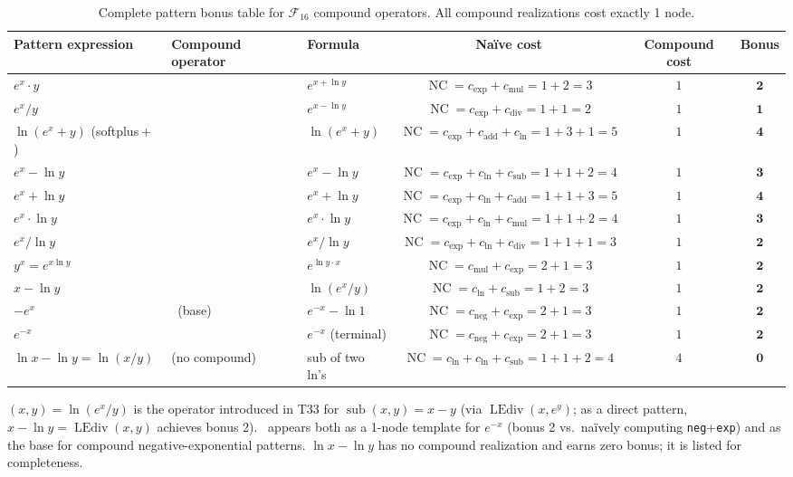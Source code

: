 \documentclass[12pt,a4paper]{article}
\theoremstyle{definition}
\newcommand{\EML}{\operatorname{EML}}
\newcommand{\EDL}{\operatorname{EDL}}
\newcommand{\EXL}{\operatorname{EXL}}
\newcommand{\EAL}{\operatorname{EAL}}
\newcommand{\DEML}{\operatorname{DEML}}
\newcommand{\ELAd}{\operatorname{ELAd}}
\newcommand{\ELSb}{\operatorname{ELSb}}
\newcommand{\LEAd}{\operatorname{LEAd}}
\newcommand{\LEdiv}{\operatorname{LEdiv}}
\newcommand{\EPL}{\operatorname{EPL}}
\newcommand{\NC}{\operatorname{NC}}
\begin{document}
\begin{table}[h]
\centering
\caption{Complete pattern bonus table for $\mathcal{F}_{16}$ compound operators.
         All compound realizations cost exactly 1 node.}
\label{tab:bonuses}
\smallskip
\begin{tabular}{@{}lllccc@{}}
\toprule
\textbf{Pattern expression}
  & \textbf{Compound operator}
  & \textbf{Formula}
  & \textbf{Na\"{i}ve cost}
  & \textbf{Compound cost}
  & \textbf{Bonus} \\
\midrule
%
$e^x \cdot y$
  & \ELAd
  & $e^{x + \ln y}$
  & $\NC = c_{\exp}+c_{\mathrm{mul}} = 1+2 = 3$
  & $1$
  & $\mathbf{2}$ \\
%
$e^x / y$
  & \ELSb
  & $e^{x - \ln y}$
  & $\NC = c_{\exp}+c_{\mathrm{div}} = 1+1 = 2$
  & $1$
  & $\mathbf{1}$ \\
%
$\ln(e^x + y)$ \textsf{(softplus$\!+\!$)}
  & \LEAd
  & $\ln(e^x + y)$
  & $\NC = c_{\exp}+c_{\mathrm{add}}+c_{\ln} = 1+3+1 = 5$
  & $1$
  & $\mathbf{4}$ \\
%
$e^x - \ln y$
  & \EML
  & $e^x - \ln y$
  & $\NC = c_{\exp}+c_{\ln}+c_{\mathrm{sub}} = 1+1+2 = 4$
  & $1$
  & $\mathbf{3}$ \\
%
$e^x + \ln y$
  & \EAL
  & $e^x + \ln y$
  & $\NC = c_{\exp}+c_{\ln}+c_{\mathrm{add}} = 1+1+3 = 5$
  & $1$
  & $\mathbf{4}$ \\
%
$e^x \cdot \ln y$
  & \EXL
  & $e^x \cdot \ln y$
  & $\NC = c_{\exp}+c_{\ln}+c_{\mathrm{mul}} = 1+1+2 = 4$
  & $1$
  & $\mathbf{3}$ \\
%
$e^x / \ln y$
  & \EDL
  & $e^x / \ln y$
  & $\NC = c_{\exp}+c_{\ln}+c_{\mathrm{div}} = 1+1+1 = 3$
  & $1$
  & $\mathbf{2}$ \\
%
$y^x = e^{x \ln y}$
  & \EPL
  & $e^{\ln y \cdot x}$
  & $\NC = c_{\mathrm{mul}}+c_{\exp} = 2+1 = 3$
  & $1$
  & $\mathbf{2}$ \\
%
$x - \ln y$
  & \LEdiv
  & $\ln(e^x / y)$
  & $\NC = c_{\ln}+c_{\mathrm{sub}} = 1+2 = 3$
  & $1$
  & $\mathbf{2}$ \\
%
$-e^x$
  & \DEML\ (base)
  & $e^{-x} - \ln 1$
  & $\NC = c_{\mathrm{neg}}+c_{\exp} = 2+1 = 3$
  & $1$
  & $\mathbf{2}$ \\
%
$e^{-x}$
  & \DEML
  & $e^{-x}$ (terminal)
  & $\NC = c_{\mathrm{neg}}+c_{\exp} = 2+1 = 3$
  & $1$
  & $\mathbf{2}$ \\
%
$\ln x - \ln y = \ln(x/y)$
  & (no compound)
  & sub of two ln's
  & $\NC = c_{\ln}+c_{\ln}+c_{\mathrm{sub}} = 1+1+2 = 4$
  & $4$
  & $\mathbf{0}$ \\
%
\bottomrule
\end{tabular}

\smallskip
\footnotesize{
\LEdiv$(x,y) = \ln(e^x/y)$ is the operator introduced in T33 for
$\operatorname{sub}(x,y)=x-y$ (via $\LEdiv(x,e^y)$; as a direct pattern,
$x - \ln y = \LEdiv(x,y)$ achieves bonus 2).
\DEML\ appears both as a 1-node template for $e^{-x}$ (bonus 2 vs.\
na\"{i}vely computing \texttt{neg}+\texttt{exp}) and as the base for
compound negative-exponential patterns.
$\ln x - \ln y$ has no compound realization and earns zero bonus; it is
listed for completeness.
}
\end{table}
\end{document}
